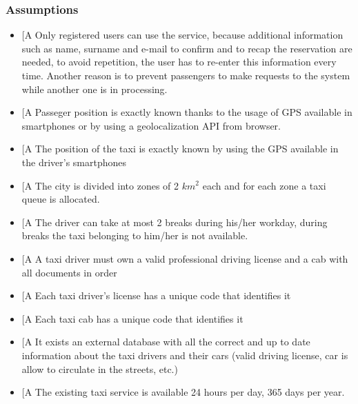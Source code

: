 \documentclass[a4paper,12pt]{article}%
\newcounter{assumptions_counter}
\begin{document}
\subsubsection{Assumptions}
\begin{itemize}
\item \label{a\arabic{assumptions_counter}}{[}A\arabic{assumptions_counter}{]}
Only registered users can use the service, because additional information such as name, surname and e-mail to confirm and to recap the reservation are needed, to avoid repetition, the user has to re-enter this information every time.
Another reason is to prevent passengers to make requests to the system while another one is in processing.
\item \label{a\arabic{assumptions_counter}}{[}A\arabic{assumptions_counter}{]} Passeger position is exactly known thanks to the usage of GPS available in smartphones or by using a geolocalization API from browser. 
\item \label{a\arabic{assumptions_counter}}{[}A\arabic{assumptions_counter}{]} The position of the taxi is exactly known by using the GPS available in the driver's smartphones
\item \label{a\arabic{assumptions_counter}}{[}A\arabic{assumptions_counter}{]} The city is divided into zones of 2 $km^2$ each and for each zone a taxi queue is allocated.
\item \label{a\arabic{assumptions_counter}}{[}A\arabic{assumptions_counter}{]} The driver can take at most 2 breaks during his/her workday, during breaks the taxi belonging to him/her is not available.
\item \label{a\arabic{assumptions_counter}}{[}A\arabic{assumptions_counter}{]} A taxi driver must own a valid professional driving license and a cab with all documents in order
\item \label{a\arabic{assumptions_counter}}{[}A\arabic{assumptions_counter}{]} Each taxi driver's license has a unique code that identifies it
\item \label{a\arabic{assumptions_counter}}{[}A\arabic{assumptions_counter}{]} Each taxi cab has a unique code that identifies it
\item \label{a\arabic{assumptions_counter}}{[}A\arabic{assumptions_counter}{]} It exists an external database with all the correct and up to date information about the taxi drivers and their cars (valid driving license, car is allow to circulate in the streets, etc.)
\item \label{a\arabic{assumptions_counter}}{[}A\arabic{assumptions_counter}{]} The existing taxi service is available 24 hours per day, 365 days per year.
\end{itemize}
\end{document}
